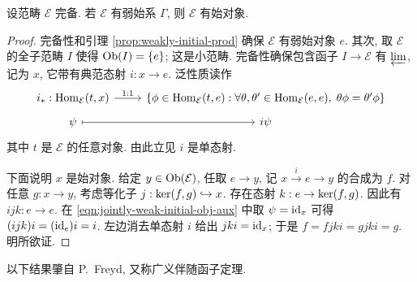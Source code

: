 \begin{lemma}\label{prop:jointly-weak-initial-obj}
	设范畴 $\mathcal{E}$ 完备. 若 $\mathcal{E}$ 有弱始系 $\Gamma$, 则 $\mathcal{E}$ 有始对象.
\end{lemma}
\begin{proof}
	完备性和引理 \ref{prop:weakly-initial-prod} 确保 $\mathcal{E}$ 有弱始对象 $e$. 其次, 取 $\mathcal{E}$ 的全子范畴 $I$ 使得 $\operatorname{Ob}(I) = \{e\}$; 这是小范畴. 完备性确保包含函子 $I \to \mathcal{E}$ 有 $\varprojlim$, 记为 $x$, 它带有典范态射 $i: x \to e$. 泛性质读作
	\begin{equation}\label{eqn:jointly-weak-initial-obj-aux}\begin{tikzcd}[row sep=tiny]
		i_*: \Hom_{\mathcal{E}}(t, x) \arrow[r, "1:1"] & \left\{ \phi \in \Hom_{\mathcal{E}}(t, e) : \forall \theta, \theta' \in \Hom_{\mathcal{E}}(e, e), \; \theta \phi = \theta' \phi \right\} \\
		\psi \arrow[r, mapsto] & i\psi
	\end{tikzcd}\end{equation}
	其中 $t$ 是 $\mathcal{E}$ 的任意对象. 由此立见 $i$ 是单态射.

	下面说明 $x$ 是始对象. 给定 $y \in \operatorname{Ob}(\mathcal{E})$, 任取 $e \to y$, 记 $x \xrightarrow{i} e \to y$ 的合成为 $f$. 对任意 $g: x \to y$, 考虑等化子 $j: \operatorname{ker}(f,g) \hookrightarrow x$. 存在态射 $k: e \to \operatorname{ker}(f, g)$. 因此有 $ijk: e \to e$. 在 \eqref{eqn:jointly-weak-initial-obj-aux} 中取 $\psi = \mathrm{id}_x$ 可得 $(ijk)i = (\mathrm{id}_e) i = i$. 左边消去单态射 $i$ 给出 $jki = \mathrm{id}_x$; 于是 $f = fjki = gjki = g$. 明所欲证.
\end{proof}

以下结果肇自 P.\ Freyd, 又称广义伴随函子定理.

